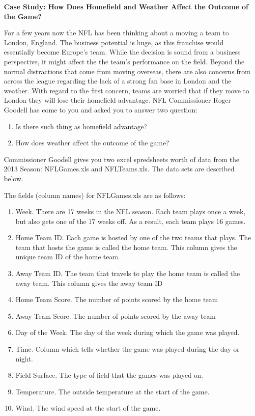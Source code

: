\documentclass{article}    %
\begin{document}
\begin{center}
\textbf{Case Study: How Does Homefield and Weather Affect the Outcome of the Game?}\\[.1cm]



\end{center}

For a few years now the NFL has been thinking about a moving a team to London, England.  The business potential is huge, as this franchise would essentially become Europe's team.  While the decision is sound from a business perspective, it might affect the the team's performance on the field.  Beyond the normal distractions that come from moving overseas, there are also concerns from across the league regarding the lack of a strong fan base in London and the weather.  With regard to the first concern, teams are worried that if they move to London they will lose their homefield advantage.  NFL Commissioner Roger Goodell has come to you and asked you to answer two question:

\begin{enumerate}
\item Is there such thing as homefield advantage?
\item How does weather affect the outcome of the game?
\end{enumerate}



Commissioner Goodell gives you two excel spredsheets worth of data from the 2013 Season: NFLGames.xls and NFLTeams.xls.  The data sets are described below. 

\medskip
  
\noindent The fields (column names) for NFLGames.xls are as follows:
\begin{enumerate}
\item Week. There are 17 weeks in the NFL season.  Each team plays once a week, but also gets one of the 17 weeks off.  As a result, each team plays 16 games.  
\item Home Team ID.  Each game is hosted by one of the two teams that plays.  The team that hosts the game is called the home team.  This column gives the unique team ID of the home team.
\item Away Team ID. The team that travels to play the home team is called the away team.  This column gives the away team ID
\item Home Team Score. The number of points scored by the home team
\item Away Team Score. The number of points scored by the away team
\item Day of the Week. The day of the week during which the game was played.
\item Time. Column which tells whether the game was played during the day or night.
\item Field Surface. The type of field that the games was played on. 
\item Temperature. The outside temperature at the start of the game.
\item Wind. The wind speed at the start of the game.
\end{enumerate}
\end{document}
